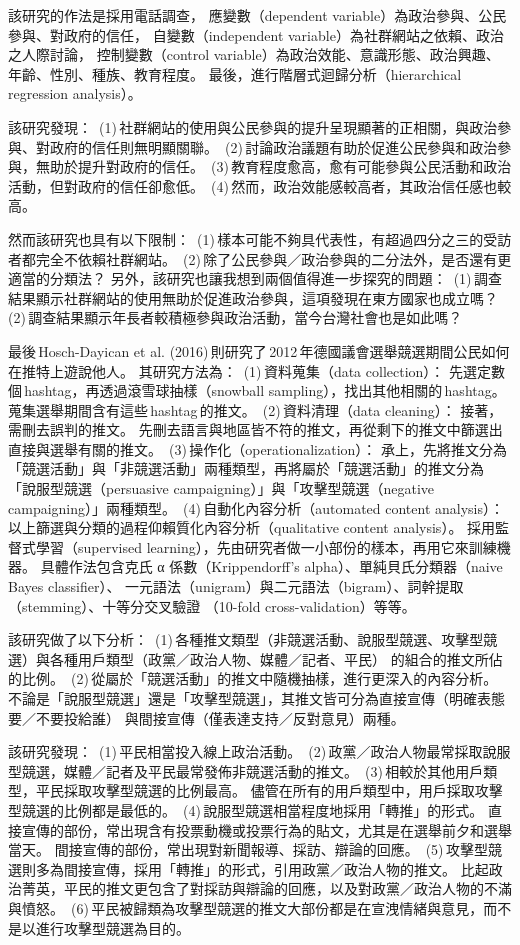 \documentclass[letterpaper, 10pt, conference]{ieeeconf}   %
\begin{document}
\begin{CJK*}{UTF8}{bsmi}
該研究的作法是採用電話調查，
應變數（dependent variable）為政治參與、公民參與、對政府的信任，
自變數（independent variable）為社群網站之依賴、政治之人際討論，
控制變數（control variable）為政治效能、意識形態、政治興趣、年齡、性別、種族、教育程度。
最後，進行階層式迴歸分析（hierarchical regression analysis）。

該研究發現：
\,(1)\,社群網站的使用與公民參與的提升呈現顯著的正相關，與政治參與、對政府的信任則無明顯關聯。
\,(2)\,討論政治議題有助於促進公民參與和政治參與，無助於提升對政府的信任。
\,(3)\,教育程度愈高，愈有可能參與公民活動和政治活動，但對政府的信任卻愈低。
\,(4)\,然而，政治效能感較高者，其政治信任感也較高。

然而該研究也具有以下限制：
\,(1)\,樣本可能不夠具代表性，有超過四分之三的受訪者都完全不依賴社群網站。
\,(2)\,除了公民參與／政治參與的二分法外，是否還有更適當的分類法？
另外，該研究也讓我想到兩個值得進一步探究的問題：
\,(1)\,調查結果顯示社群網站的使用無助於促進政治參與，這項發現在東方國家也成立嗎？
\,(2)\,調查結果顯示年長者較積極參與政治活動，當今台灣社會也是如此嗎？

最後\,Hosch-Dayican et al. (2016)\,則研究了\,2012\,年德國議會選舉競選期間公民如何在推特上遊說他人。\cite{c3}
其研究方法為：
\,(1)\,資料蒐集（data collection）：
先選定數個\,hashtag，再透過滾雪球抽樣（snowball sampling），找出其他相關的\,hashtag。
蒐集選舉期間含有這些\,hashtag\,的推文。
\,(2)\,資料清理（data cleaning）：
接著，需刪去誤判的推文。
先刪去語言與地區皆不符的推文，再從剩下的推文中篩選出直接與選舉有關的推文。
\,(3)\,操作化（operationalization）：
承上，先將推文分為「競選活動」與「非競選活動」兩種類型，再將屬於「競選活動」的推文分為
「說服型競選（persuasive campaigning）」與「攻擊型競選（negative campaigning）」兩種類型。
\,(4)\,自動化內容分析（automated content analysis）：
以上篩選與分類的過程仰賴質化內容分析（qualitative content analysis）。
採用監督式學習（supervised learning），先由研究者做一小部份的樣本，再用它來訓練機器。
具體作法包含克氏 α 係數（Krippendorff's alpha）、單純貝氏分類器（naive Bayes classifier）、
一元語法（unigram）與二元語法（bigram）、詞幹提取（stemming）、十等分交叉驗證
（10-fold cross-validation）等等。

該研究做了以下分析：
\,(1)\,各種推文類型（非競選活動、說服型競選、攻擊型競選）與各種用戶類型（政黨／政治人物、媒體／記者、平民）
的組合的推文所佔的比例。
\,(2)\,從屬於「競選活動」的推文中隨機抽樣，進行更深入的內容分析。
不論是「說服型競選」還是「攻擊型競選」，其推文皆可分為直接宣傳（明確表態要／不要投給誰）
與間接宣傳（僅表達支持／反對意見）兩種。

該研究發現：
\,(1)\,平民相當投入線上政治活動。
\,(2)\,政黨／政治人物最常採取說服型競選，媒體／記者及平民最常發佈非競選活動的推文。
\,(3)\,相較於其他用戶類型，平民採取攻擊型競選的比例最高。
儘管在所有的用戶類型中，用戶採取攻擊型競選的比例都是最低的。
\,(4)\,說服型競選相當程度地採用「轉推」的形式。
直接宣傳的部份，常出現含有投票動機或投票行為的貼文，尤其是在選舉前夕和選舉當天。
間接宣傳的部份，常出現對新聞報導、採訪、辯論的回應。
\,(5)\,攻擊型競選則多為間接宣傳，採用「轉推」的形式，引用政黨／政治人物的推文。
比起政治菁英，平民的推文更包含了對採訪與辯論的回應，以及對政黨／政治人物的不滿與憤怒。
\,(6)\,平民被歸類為攻擊型競選的推文大部份都是在宣洩情緒與意見，而不是以進行攻擊型競選為目的。


\end{CJK*}
\end{document}

